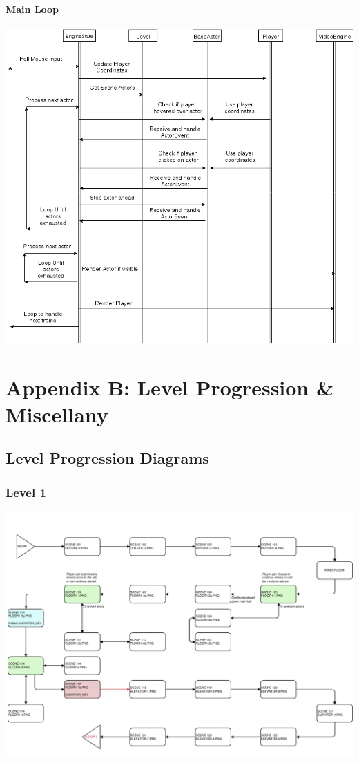 \documentclass{article}
\begin{document}
			\paragraph{Main Loop}
				\begin{center}
					\includegraphics[scale=0.54,angle=90]{main-loop.png}
				\end{center}
%
%
\newpage
\section{Appendix B: Level Progression \& Miscellany}
	\subsection{Level Progression Diagrams}
		\subsubsection{Level 1}
			\begin{center}
				\includegraphics[scale=0.6, angle=90]{LevelProg1.png}
			\end{center} 
\end{document}
